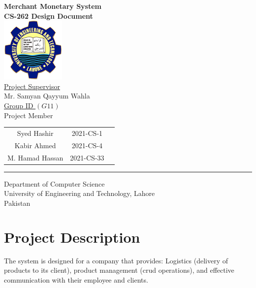 \documentclass[12pt,a4paper]{report}
\begin{document}
\thispagestyle{empty}
\begin{center}
\textbf{\large{Merchant Monetary System}}\\
\vspace{0.5cm}
\textbf{ CS-262 Design Document} \\
\vspace{1.5cm}
\includegraphics[scale=.07]{UETLogo}\\
\vspace{1.5cm}
\underline{ Project Supervisor}\\
\vspace{0.5cm}
Mr. Samyan Qayyum Wahla\\
\vspace{1cm}
\underline {Group ID $(G 11)$} \\
\vspace{0.5cm}
Project Member\\
\vspace{0.5cm}
\begin{tabular}{c c c }
 Syed Hashir & 2021-CS-1 \\ 
 Kabir Ahmed & 2021-CS-4  \\  
 M. Hamad Hassan & 2021-CS-33
\end{tabular}
\vspace{2cm}
\par\rule{\textwidth}{0.5pt} 
Department of Computer Science\\
University of Engineering and Technology, Lahore\\
Pakistan
\end{center}
\newpage

\tableofcontents
\thispagestyle{empty}


\newpage
\setcounter{page}{1}
\chapter {Project Description}

The system is designed for a company that provides:
Logistics (delivery of products to its client), product management (crud operations), and effective communication with their employee and clients.
 
\end{document}
